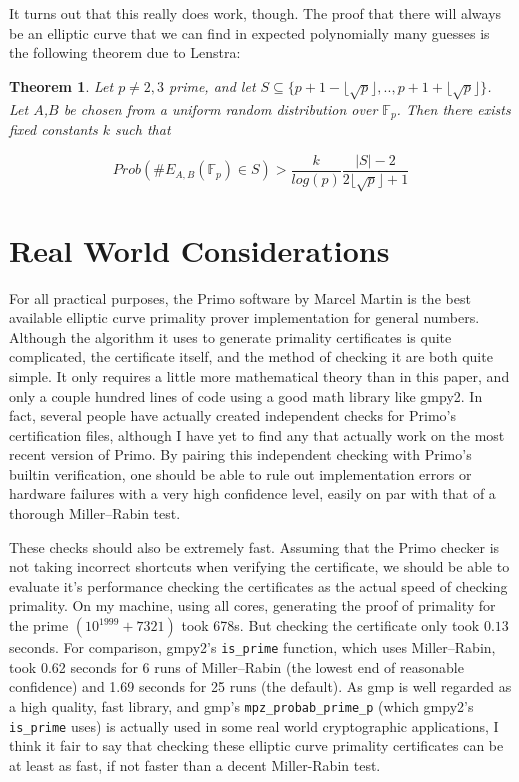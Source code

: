 \documentclass[]{article}
\newtheorem{theorem}{Theorem}
\newcommand{\F}{\mathbb{F}}
\newcommand{\floor}[1]{\lfloor #1 \rfloor}
\begin{document}
It turns out that this really does work, though. The proof that there will always be an elliptic curve that we can find in expected polynomially many guesses is the following theorem due to Lenstra:

\begin{theorem}
Let $p \ne 2,3$ prime, and let $S \subseteq \{p+1 - \floor{\sqrt{p}},.., p+1 + \floor{\sqrt{p}}\}$. Let $A$,$B$ be  chosen from a uniform random distribution over $\F_p$. Then there exists fixed constants $k$ such that

$$Prob(\# E_{A,B}(\F_p) \in S) > \frac{k}{log(p)} \frac{|S|-2}{2 \floor{\sqrt{p}}+1}$$
\end{theorem}

\section{Real World Considerations}

For all practical purposes, the Primo software by Marcel Martin is the best available elliptic curve primality prover implementation for general numbers. Although the algorithm it uses to generate primality certificates is quite complicated, the certificate itself, and the method of checking it are both quite simple. It only requires a little more mathematical theory than in this paper, and only a couple hundred lines of code using a good math library like gmpy2. In fact, several people have actually created independent checks for Primo's certification files, although I have yet to find any that actually work on the most recent version of Primo. By pairing this independent checking with Primo's builtin verification, one should be able to rule out implementation errors or hardware failures with a very high confidence level, easily on par with that of a thorough Miller--Rabin test.

These checks should also be extremely fast. Assuming that the Primo checker is not taking incorrect shortcuts when verifying the certificate, we should be able to evaluate it's performance checking the certificates as the actual speed of checking primality. On my machine, using all cores, generating the proof of primality for the prime $(10^{1999} + 7321)$ took 678s. But checking the certificate only took $0.13$ seconds. For comparison, gmpy2's \texttt{is\_prime} function, which uses Miller--Rabin,  took 0.62 seconds for 6 runs of Miller--Rabin (the lowest end of reasonable confidence) and 1.69 seconds for 25 runs (the default). As gmp is well regarded as a high quality, fast library, and gmp's \texttt{mpz\_probab\_prime\_p} (which gmpy2's \texttt{is\_prime} uses) is actually used in some real world cryptographic applications, I think it fair to say that checking these elliptic curve primality certificates can be at least as fast, if not faster than a decent Miller-Rabin test.
\end{document}
